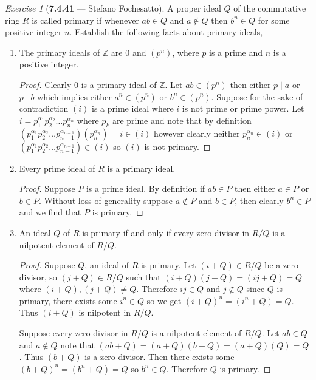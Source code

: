 \documentclass[12pt]{amsart}
\theoremstyle{remark}
\newtheorem*{exercise}{Exercise}%
\newcommand{\ZZ}{{\mathbb Z}}
\theoremstyle{mycomment}
\begin{document}
\begin{exercise}[\textbf{7.4.41} --- Stefano Fochesatto] A proper ideal $Q$ of the commutative ring $R$ is called primary if whenever 
  $ab \in Q$ and $a \not\in Q$ then $b^n  \in Q$ for some positive integer $n$. Establish the following facts about 
  primary ideals, 
  \begin{enumerate}
  \item[(a)] The primary ideals of $\ZZ$ are $0$ and $(p^n)$, where $p$ is a prime and $n$ is a positive integer.
  \begin{proof} Clearly $0$ is a primary ideal of $\ZZ$. Let $ab \in (p^n)$ then either $p\mid a$ or $p\mid b$ which implies either $a^n  \in (p^n)$ or $b^n  \in (p^n)$.
    Suppose for the sake of contradiction $(i)$ is a prime ideal where $i$ is not prime or prime power. Let $i = p_1^{\alpha_1}p_2^{\alpha_2} \dots p_n^{\alpha_n}$ where $p_k$ are prime and 
    note that by definition $(p_1^{\alpha_1}p_2^{\alpha_2} \dots p_{n - 1}^{\alpha_{n - 1}})(p_n^{\alpha_n}) = i \in (i)$ however clearly neither $p_n^{\alpha_n} \in (i)$ or $(p_1^{\alpha_1}p_2^{\alpha_2} \dots p_{n - 1}^{\alpha_{n - 1}}) \in (i)$
    so $(i)$ is not primary. 
  \end{proof}
\vspace{.15in}

\item[(b)] Every prime ideal of $R$ is a primary ideal. 
\begin{proof} Suppose $P$ is a prime ideal. By definition if $ab \in P$ then either $a \in P$ or $b \in P$. Without loss of generality suppose 
  $a \not\in P$ and $b \in P$, then clearly $b^n \in P$ and we find that $P$ is primary. 
\end{proof}
\vspace{.15in}

\item[(c)] An ideal $Q$ of $R$ is primary if and only if every zero divisor in $R/Q$ is a nilpotent element of $R/Q$. 
\begin{proof} Suppose $Q$, an ideal of $R$ is primary. Let $(i + Q) \in R/Q$ be a zero divisor, so $(j + Q) \in R/Q$ such that $(i + Q)(j + Q) = (ij + Q) = Q$ where $(i + Q),(j + Q) \neq Q$. Therefore 
  $ij \in Q$ and $j \not\in Q$ since $Q$ is primary, there exists some $i^n \in Q$ so we get $(i + Q)^n = (i^n + Q) = Q$. Thus $(i + Q)$ is nilpotent in $R/Q$. 

  Suppose every zero divisor in $R/Q$ is a nilpotent element of $R/Q$. Let $ab \in Q$ and $a \not\in Q$ note that $(ab + Q) = (a + Q)(b + Q) = (a + Q)(Q) = Q$. Thus 
  $(b + Q)$ is a zero divisor. Then there exists some $(b + Q)^n = (b^n + Q) = Q$ so $b^n \in Q$. Therefore $Q$ is primary. 
\end{proof}
\vspace{.15in}


\end{enumerate}
\end{exercise}
\end{document}
